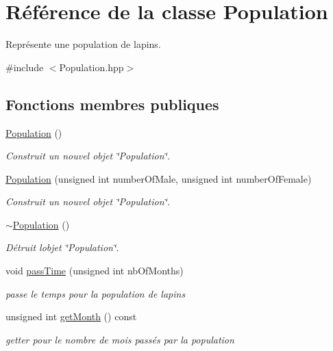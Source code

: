 \hypertarget{classPopulation}{}\section{Référence de la classe Population}
\label{classPopulation}


Représente une population de lapins.  




{\ttfamily \#include $<$Population.\+hpp$>$}

\subsection*{Fonctions membres publiques}
\begin{DoxyCompactItemize}
\item 
\hyperlink{classPopulation_a54eb24ca89470eebe0c27bcb03a0ceae}{Population} ()
\begin{DoxyCompactList}\small\item\em Construit un nouvel objet \char`\"{}\+Population\char`\"{}. \end{DoxyCompactList}\item 
\hyperlink{classPopulation_a8bf0924406fb56bb5177016d5ebd7911}{Population} (unsigned int number\+Of\+Male, unsigned int number\+Of\+Female)
\begin{DoxyCompactList}\small\item\em Construit un nouvel objet \char`\"{}\+Population\char`\"{}. \end{DoxyCompactList}\item 
\hyperlink{classPopulation_a4c8cedd0f038e41746fb6084639f5616}{$\sim$\+Population} ()
\begin{DoxyCompactList}\small\item\em Détruit l\textquotesingle{}objet \char`\"{}\+Population\char`\"{}. \end{DoxyCompactList}\item 
void \hyperlink{classPopulation_a4a4eef2f12f2f46c1fafef5ca4db2933}{pass\+Time} (unsigned int nb\+Of\+Months)
\begin{DoxyCompactList}\small\item\em passe le temps pour la population de lapins \end{DoxyCompactList}\item 
unsigned int \hyperlink{classPopulation_a509a07b43df688b3b3235f586e5b3c07}{get\+Month} () const
\begin{DoxyCompactList}\small\item\em getter pour le nombre de mois passés par la population \end{DoxyCompactList}\item 

\end{DoxyCompactItemize}
